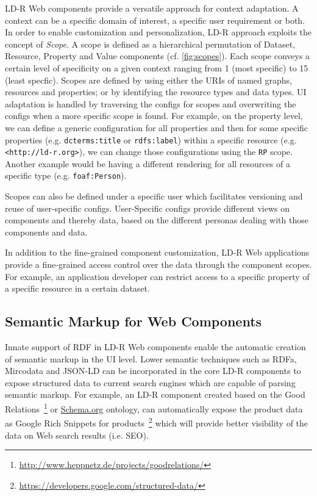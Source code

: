 \documentclass{acm_proc_article-sp}
\begin{document}
LD-R Web components provide a versatile approach for context adaptation.
A context can be a specific domain of interest, a specific user requirement or both.
In order to enable customization and personalization, LD-R approach exploits the concept of \emph{Scope}.
A scope is defined as a hierarchical permutation of Dataset, Resource, Property and Value components (cf. \autoref{fig:scopes}).
Each scope conveys a certain level of specificity on a given context ranging from 1 (most specific) to 15 (least specfic).
Scopes are defined by using either the URIs of named graphs, resources and properties; or by identifying the resource types and data types.
UI adaptation is handled by traversing the configs for scopes and overwriting the configs when a more specific scope is found.
For example, on the property level, we can define a generic configuration for all properties and then for some specific properties (e.g. \texttt{dcterms:title} or \texttt{rdfs:label}) within a specific resource (e.g. \texttt{<http://ld-r.org>}), we can change those configurations using the \texttt{RP} scope.
Another example would be having a different rendering for all resources of a specific type (e.g. \texttt{foaf:Person}).

Scopes can also be defined under a specific user which facilitates versioning and reuse of user-specific configs.
User-Specific configs provide different views on components and thereby data, based on the different personas dealing with those components and data.

In addition to the fine-grained component customization, LD-R Web applications provide a fine-grained access control over the data through the component scopes.
For example, an application developer can restrict access to a specific property of a specific resource in a certain dataset.

\subsection{Semantic Markup for Web Components}
\label{sec:markup}
Innate support of RDF in LD-R Web components enable the automatic creation of semantic markup in the UI level.
Lower semantic techniques such as RDFa, Mircodata and JSON-LD can be incorporated in the core LD-R components to expose structured data to current search engines which are capable of parsing semantic markup.
For example, an LD-R component created based on the Good Relations~\footnote{\url{http://www.heppnetz.de/projects/goodrelations/}} or \url{Schema.org} ontology, can automatically expose the product data as Google Rich Snippets for products~\footnote{\url{https://developers.google.com/structured-data/}} which will provide better visibility of the data on Web search results (i.e. SEO).
\end{document}
